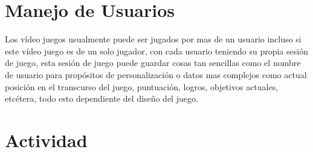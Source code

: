 \section{Manejo de Usuarios}
Los vídeo juegos usualmente puede ser jugados por mas de un usuario incluso si este vídeo juego es de un solo jugador, con cada usuario teniendo su propia sesión de juego, esta sesión de juego puede guardar cosas tan sencillas como el nombre de usuario para propósitos de personalización o datos mas complejos como actual posición en el transcurso del juego, puntuación, logros, objetivos actuales, etcétera, todo esto dependiente del diseño del juego.

\section{Actividad}
